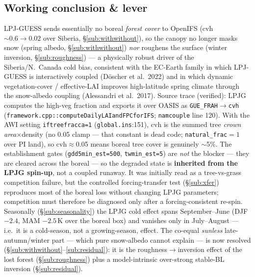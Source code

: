 \documentclass[10pt]{article}
\begin{document}
\subsection{Working conclusion \& lever}
LPJ-GUESS sends essentially no boreal \emph{forest cover} to OpenIFS (cvh $\sim0.6\to0.02$ over Siberia,
\S\ref{sub:withwithout}), so the canopy no longer masks snow (spring albedo, \S\ref{sub:withwithout}) \emph{nor}
roughens the surface (winter inversion, \S\ref{sub:roughness}) --- a physically robust driver of the
Siberia/N.\ Canada cold bias, consistent with the EC-Earth family in which LPJ-GUESS is interactively coupled
(D\"oscher et al.\ 2022) and in which dynamic vegetation-cover / effective-LAI improves high-latitude spring climate
through the snow-albedo coupling (Alessandri et al.\ 2017). Source trace (verified): LPJG computes the high-veg fraction and
exports it over OASIS as \texttt{GUE\_FRAH}$\to$\texttt{cvh} (\texttt{framework.cpp::computeDailyLAIandFPCforIFS};
\texttt{namcouple} line 120). With the AWI setting \texttt{iftreefracca=1} (\texttt{global.ins}:151), cvh is the
summed tree \emph{crown area}$\times$density (no 0.05 clamp --- that constant is dead code; \texttt{natural\_frac}$=1$
over PI land), so cvh$\approx$0.05 means boreal tree cover is genuinely $\sim$5\%. The establishment gates
(\texttt{gdd5min\_est=500}, \texttt{twmin\_est=5}) are \emph{not} the blocker --- they are cleared across the boreal ---
so the degraded state is \textbf{inherited from the LPJG spin-up}, not a coupled runaway. It was initially read as
a tree-vs-grass competition failure, but the controlled forcing-transfer test
(\S\ref{sub:xfer}) reproduces most of the boreal loss without changing LPJG parameters; competition must therefore
be diagnosed only after a forcing-consistent re-spin. Seasonally (\S\ref{sub:seasonality})
the LPJG cold effect spans September--June (DJF $-2.4$, MAM $-2.5$\,K over the boreal box)
and vanishes only in July--August --- i.e.\ it is a cold-season, not a growing-season, effect. The co-equal
\emph{sunless} late-autumn/winter part --- which pure snow-albedo cannot explain --- is now
resolved (\S\ref{sub:withwithout}--\ref{sub:residual}): it is the roughness$\to$inversion effect of the lost
forest (\S\ref{sub:roughness}) plus a model-intrinsic over-strong stable-BL inversion (\S\ref{sub:residual}).
\end{document}

